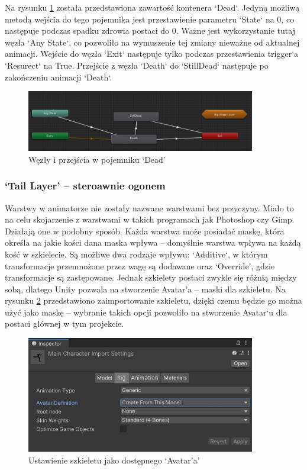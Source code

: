 \documentclass[12pt,twoside]{article}
\begin{document}
Na rysunku \ref{Hero:Aniamtor:Death}  została przedstawiona zawartość kontenera
`Dead`. Jedyną możliwą metodą wejścia do tego pojemnika jest przestawienie
parametru `State` na 0, co następuje podczas spadku zdrowia postaci do 0. Ważne
jest wykorzystanie tutaj węzła `Any State`, co pozwoliło na wymuszenie tej
zmiany nieważne od aktualnej animacji. Wejście do węzła `Exit` następuje tylko
podczas przestawienia trigger`a `Resurect` na True. Przejście z węzła `Death` do
`StillDead` następuje po zakończeniu animacji `Death`.\begin{figure}[!ht]
    \centering
	\includegraphics[width=10cm]{RealizacjaProjektu/UnityPictires/Animator/Player1_Animator_Dead.jpg}
	\caption{Węzły i przejścia w pojemniku `Dead'}
    \label{Hero:Aniamtor:Death}
\end{figure}

\clearpage
\subsubsection{`Tail Layer' -- steroawnie ogonem}

Warstwy w animatorze nie zostały nazwane warstwami bez przyczyny. Miało to na
celu skojarzenie z warstwami w takich programach jak Photoshop czy Gimp.
Działają one w podobny sposób. Każda warstwa może posiadać maskę, która określa
na jakie kości dana maska wpływa -- domyślnie warstwa wpływa na każdą kość w
szkielecie. Są możliwe dwa rodzaje wpływu: `Additive`, w którym transformacje
przemnożone przez wagę są dodawane oraz ‘Override’, gdzie transformacje są
zastępowane. Jednak szkielety postaci zwykle się różnią między sobą, dlatego
Unity pozwala na stworzenie Avatar’a -- maski dla szkieletu. Na rysunku
\ref{Hero:Avatar:Definition} przedstawiono zaimportowanie szkieletu, dzięki
czemu będzie go można użyć jako maskę -- wybranie takich opcji pozwoliło na
stworzenie Avatar`u dla postaci głównej w tym projekcie. 

\begin{figure}[!ht]
    \centering
	\includegraphics[width=10cm]{RealizacjaProjektu/UnityPictires/Animator/PLayer1_Avatar_definition.jpg}
	\caption{Ustawienie szkieletu jako dostępnego `Avatar’a'}
    \label{Hero:Avatar:Definition}
\end{figure}
\end{document}
